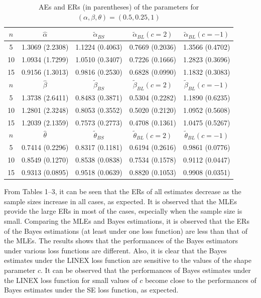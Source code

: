\documentclass[twoside]{article}
\begin{document}
\begin{table}[!ht]
\centering
\caption{{\small AEs and ERs (in parentheses) of the parameters for $(\alpha, \beta, \theta) = (0.5, 0.25, 1)$}}
{ \small
\begin{tabular}[c]{ccccc}
\hline
$ n $ & ${\hat \alpha}$ & $ {{\tilde \alpha}_{BS}} $ & $ {{\tilde \alpha}_{BL}} (c=2)$ & $ {{\tilde \alpha}_{BL}} (c=-1)$  \\
\hline
5 &1.3069 (2.2308)& 1.1224 (0.4063)& 0.7669 (0.2036)& 1.3566 (0.4702) \\
10 &1.0934 (1.7299)& 1.0510 (0.3407)& 0.7226 (0.1666)& 1.2823 (0.3696) \\
15 &0.9156 (1.3013)& 0.9816 (0.2530)& 0.6828 (0.0990)& 1.1832 (0.3083) \\
\hline
$ n $ & ${\hat \beta}$ & $ {{\tilde \beta}_{BS}} $ & $ {{\tilde \beta}_{BL}} (c=2)$ & $ {{\tilde \beta}_{BL}} (c=-1)$  \\
\hline
5 &1.3738 (2.6411)& 0.8483 (0.3871)& 0.5304 (0.2282)& 1.1890 (0.6235) \\
10 &1.2801 (2.3248)& 0.8053 (0.3552)& 0.5020 (0.2120)& 1.0952 (0.5608) \\
15 &1.2039 (2.1359)& 0.7573 (0.2773)& 0.4708 (0.1361)& 1.0475 (0.5267) \\
\hline
$ n $ & ${\hat \theta}$ & $ {{\tilde \theta}_{BS}} $ & $ {{\tilde \theta}_{BL}} (c=2)$ & $ {{\tilde \theta}_{BL}} (c=-1)$  \\
\hline
5 &0.7414 (0.2296)& 0.8317 (0.1181)& 0.6194 (0.2616)& 0.9861 (0.0776) \\
10 &0.8549 (0.1270)& 0.8538 (0.0838)& 0.7534 (0.1578)& 0.9112 (0.0447) \\
15 &0.9313 (0.0895)& 0.9518 (0.0639)& 0.8820 (0.1053)& 0.9908 (0.0351) \\
\hline
\end{tabular}
}
\end{table}

From Tables 1--3, it can be seen that the ERs of all estimates decrease as the sample sizes increase in all cases, as expected. It is observed that the MLEs provide the large ERs in most of the cases, especially when the sample size is small. Comparing the MLEs and Bayes estimations, it is observed that the ERs of the Bayes estimations (at least under one loss function) are less than that of the MLEs. The results shows that the performances of the Bayes estimators under various loss functions are different. Also, it is clear that the Bayes estimates under the LINEX loss function are sensitive to the values of the shape parameter $c$. It can be observed that the performances of Bayes estimates under the LINEX loss function for small values of $c$ become close to the performances of Bayes estimates under the SE loss function, as expected.  
\end{document}
